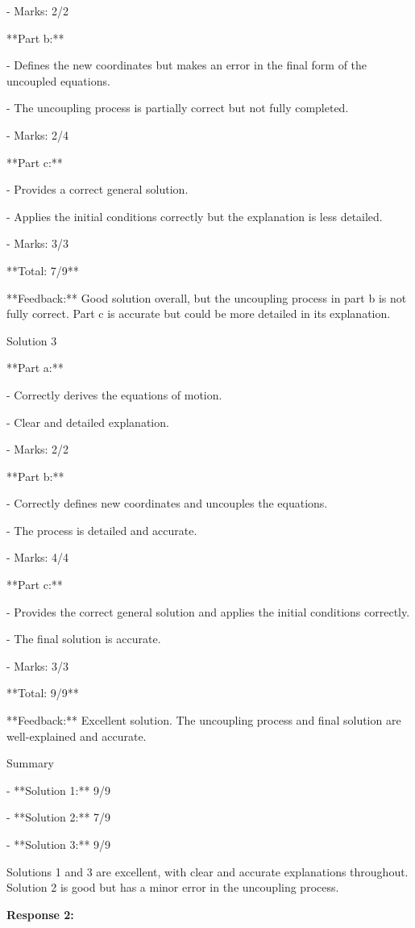 \documentclass[a4paper,11pt]{article}
\begin{document}
- Marks: 2/2

**Part b:**

- Defines the new coordinates but makes an error in the final form of the uncoupled equations.

- The uncoupling process is partially correct but not fully completed.

- Marks: 2/4

**Part c:**

- Provides a correct general solution.

- Applies the initial conditions correctly but the explanation is less detailed.

- Marks: 3/3

**Total: 7/9**

**Feedback:** Good solution overall, but the uncoupling process in part b is not fully correct. Part c is accurate but could be more detailed in its explanation.

Solution 3

**Part a:**

- Correctly derives the equations of motion.

- Clear and detailed explanation.

- Marks: 2/2

**Part b:**

- Correctly defines new coordinates and uncouples the equations.

- The process is detailed and accurate.

- Marks: 4/4

**Part c:**

- Provides the correct general solution and applies the initial conditions correctly.

- The final solution is accurate.

- Marks: 3/3

**Total: 9/9**

**Feedback:** Excellent solution. The uncoupling process and final solution are well-explained and accurate.

Summary

- **Solution 1:** 9/9

- **Solution 2:** 7/9

- **Solution 3:** 9/9

Solutions 1 and 3 are excellent, with clear and accurate explanations throughout. Solution 2 is good but has a minor error in the uncoupling process.

\bigskip
\textbf{Response 2:}
\end{document}
